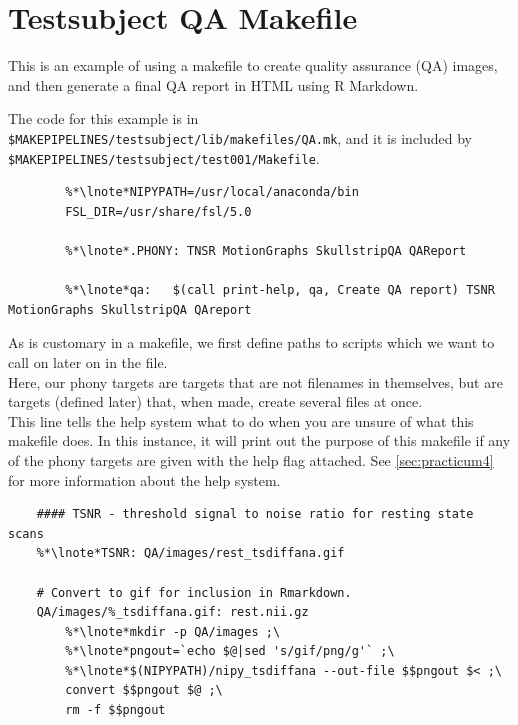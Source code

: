 \section{Testsubject QA Makefile}
\label{example:testsubjectQA}

This is an example of using a makefile to create quality assurance (QA) images, and then generate a final QA report in HTML using R Markdown. 

The code for this example is in \texttt{\$MAKEPIPELINES/testsubject/lib/makefiles/QA.mk}, and it is included by \texttt{\$MAKEPIPELINES/testsubject/test001/Makefile}.

\setcounter{codehighlight}{0} %
\begin{lstlisting}
		%*\lnote*NIPYPATH=/usr/local/anaconda/bin
		FSL_DIR=/usr/share/fsl/5.0

		%*\lnote*.PHONY: TNSR MotionGraphs SkullstripQA QAReport

		%*\lnote*qa:   $(call print-help, qa, Create QA report) TSNR MotionGraphs SkullstripQA QAreport
\end{lstlisting}

\noindent{} As is customary in a makefile, we first define paths to scripts which we want to call on later on in the file. \\
 Here, our phony targets are targets that are not filenames in themselves, but are targets (defined later) that, when made, create several files at once. \\
 This line tells the \maken{} help system what to do when you are unsure of what this makefile does. In this instance, it will print out the purpose of this makefile if any of the phony targets are given with the help flag attached. See \autoref{sec:practicum4} for more information about the help system. \\

\begin{lstlisting}
	#### TSNR - threshold signal to noise ratio for resting state scans
	%*\lnote*TSNR: QA/images/rest_tsdiffana.gif

	# Convert to gif for inclusion in Rmarkdown. 
	QA/images/%_tsdiffana.gif: rest.nii.gz
		%*\lnote*mkdir -p QA/images ;\
		%*\lnote*pngout=`echo $@|sed 's/gif/png/g'` ;\
		%*\lnote*$(NIPYPATH)/nipy_tsdiffana --out-file $$pngout $< ;\
		convert $$pngout $@ ;\
		rm -f $$pngout
\end{lstlisting}

